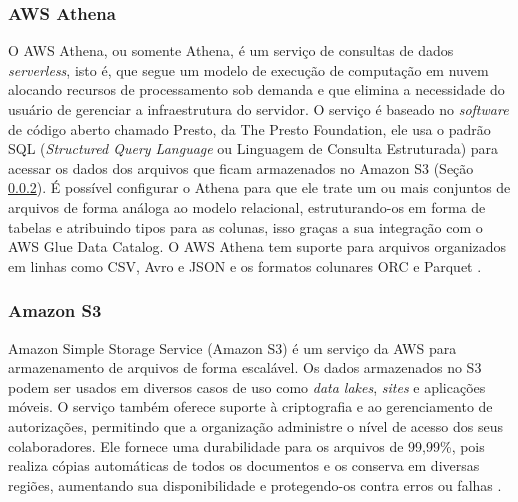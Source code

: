 \subsubsection{AWS Athena}
\label{subsec:athena}

O AWS Athena, ou somente Athena, é um serviço de consultas de dados \textit{serverless}, isto é, que segue um modelo de execução de computação em nuvem alocando recursos de processamento sob demanda e que elimina a necessidade do usuário de gerenciar a infraestrutura do servidor. O serviço é baseado no \textit{software} de código aberto chamado Presto, da The Presto Foundation, ele usa o padrão SQL (\textit{Structured Query Language} ou Linguagem de Consulta Estruturada) para acessar os dados dos arquivos que ficam armazenados no Amazon S3 (Seção \ref{subsec:s3}). É possível configurar o Athena para que ele trate um ou mais conjuntos de arquivos de forma análoga ao modelo relacional, estruturando-os em forma de tabelas e atribuindo tipos para as colunas, isso graças a sua integração com o AWS Glue Data Catalog. O AWS Athena tem suporte para arquivos organizados em linhas como CSV, Avro e JSON e os formatos colunares ORC e Parquet \cite{aws:athena}.

\subsubsection{Amazon S3}
\label{subsec:s3}

Amazon Simple Storage Service (Amazon S3) é um serviço da AWS para armazenamento de arquivos de forma escalável. Os dados armazenados no S3 podem ser usados em diversos casos de uso como \textit{data lakes}, \textit{sites} e aplicações móveis. O serviço também oferece suporte à criptografia e ao gerenciamento de autorizações, permitindo que a organização administre o nível de acesso dos seus colaboradores. Ele fornece uma durabilidade para os arquivos de 99,99\%, pois realiza cópias automáticas de todos os documentos e os conserva em diversas regiões, aumentando sua disponibilidade e protegendo-os contra erros ou falhas \cite{aws:s3}.


